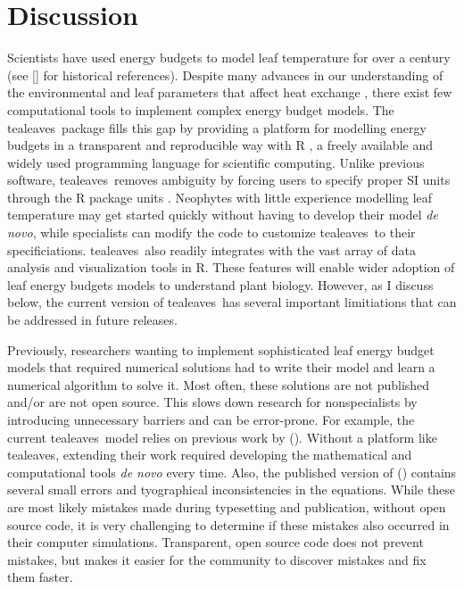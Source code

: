 \documentclass[11pt, oneside]{article}
\newcommand{\pkg}[1]{{\fontseries{b}\selectfont #1}}
\newcommand{\tealeaves}{\pkg{tealeaves}}
\begin{document}
\section*{Discussion}

Scientists have used energy budgets to model leaf temperature for over a century (see \citeauthor{Raschke_1960} [\citeyear{Raschke_1960}] for historical references). Despite many advances in our understanding of the environmental and leaf parameters that affect heat exchange \citep{Gutschick_2016}, there exist few computational tools to implement complex energy budget models. The \tealeaves~package fills this gap by providing a platform for modelling energy budgets in a transparent and reproducible way with R \citep{R_2019}, a freely available and widely used programming language for scientific computing. Unlike previous software, \tealeaves~removes ambiguity by forcing users to specify proper SI units through the R package \pkg{units} \citep{Pebesma_etal_2016}. Neophytes with little experience modelling leaf temperature may get started quickly without having to develop their model \textit{de novo}, while specialists can modify the code to customize \tealeaves~to their specificiations. \tealeaves~also readily integrates with the vast array of data analysis and visualization tools in R. These features will enable wider adoption of leaf energy budgets models to understand plant biology. However, as I discuss below, the current version of \tealeaves~has several important limitiations that can be addressed in future releases.

Previously, researchers wanting to implement sophisticated leaf energy budget models that required numerical solutions had to write their model and learn a numerical algorithm to solve it. Most often, these solutions are not published and/or are not open source. This slows down research for nonspecialists by introducing unnecessary barriers and can be error-prone. For example, the current \tealeaves~model relies on previous work by \citeauthor{Foster_Smith_1986} (\citeyear{Foster_Smith_1986}). Without a platform like \tealeaves, extending their work required developing the mathematical and computational tools \textit{de novo} every time. Also, the published version of \citeauthor{Foster_Smith_1986} (\citeyear{Foster_Smith_1986}) contains several small errors and tyographical inconsistencies in the equations. While these are most likely mistakes made during typesetting and publication, without open source code, it is very challenging to determine if these mistakes also occurred in their computer simulations. Transparent, open source code does not prevent mistakes, but makes it easier for the community to discover mistakes and fix them faster. 
\end{document}
